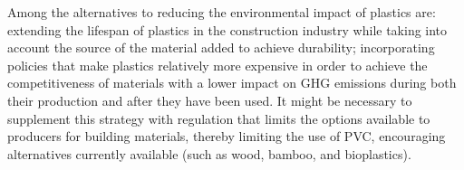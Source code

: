 Among the alternatives to reducing the environmental impact of plastics are: extending the lifespan of plastics in the construction industry while taking into account the source of the material added to achieve durability; incorporating policies that make plastics relatively more expensive in order to achieve the competitiveness of materials with a lower impact on GHG emissions during both their production and after they have been used. It might be necessary to supplement this strategy with regulation that limits the options available to producers for building materials, thereby limiting the use of PVC, encouraging alternatives currently available (such as wood, bamboo, and bioplastics). 



